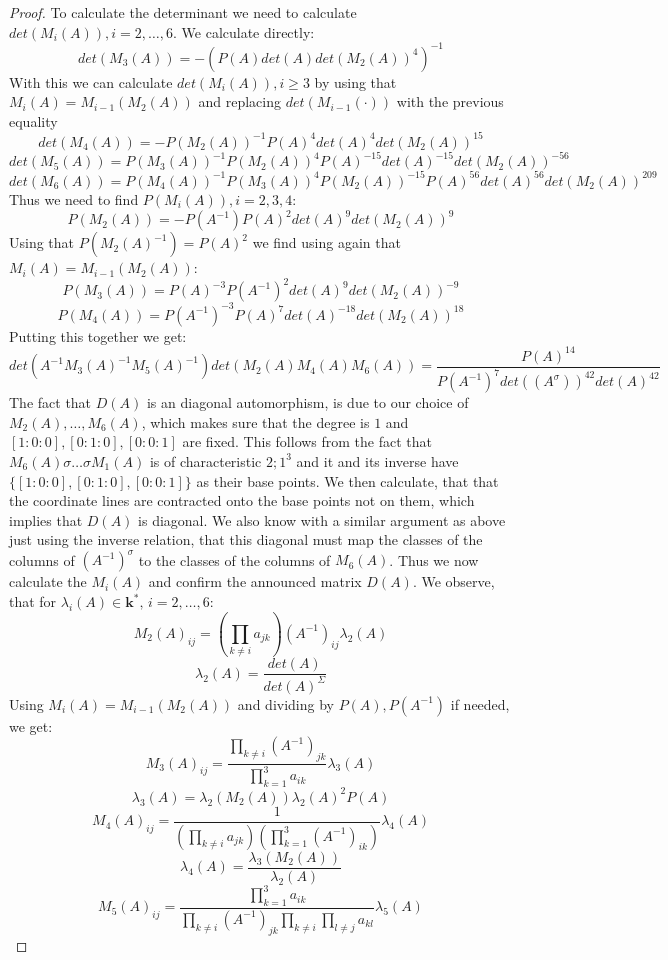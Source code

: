 \documentclass[12pt, oneside, reqno]{amsart}
\begin{document}
\begin{proof}
    To calculate the determinant we need to calculate $det(M_i(A)), i=2, \dots , 6$. We calculate directly:
    \[det(M_3(A))=-(P(A)det(A)det(M_2(A))^4)^{-1}\]
    With this we can calculate $det(M_i(A)), i \geq 3$ by using that $M_i(A) = M_{i-1}(M_2(A))$ and replacing $det(M_{i-1}(\cdot))$ with the previous equality
    \[det(M_4(A))=-P(M_2(A))^{-1}P(A)^4det(A)^4det(M_2(A))^{15}\]
    \[det(M_5(A))=P(M_3(A))^{-1}P(M_2(A))^4P(A)^{-15}det(A)^{-15}det(M_2(A))^{-56}\]
    \[det(M_6(A))=P(M_4(A))^{-1}P(M_3(A))^4P(M_2(A))^{-15}P(A)^{56}det(A)^{56}det(M_2(A))^{209}\]
    Thus we need to find $P(M_i(A)), i=2,3,4$:
    \[P(M_2(A)) = -P(A^{-1})P(A)^2det(A)^9det(M_2(A))^9\]
    Using that $P(M_2(A)^{-1}) = P(A)^2$ we find using again that $M_i(A) = M_{i-1}(M_2(A))$:
    \[P(M_3(A)) = P(A)^{-3}P(A^{-1})^2det(A)^9det(M_2(A))^{-9}\]
    \[P(M_4(A))=P(A^{-1})^{-3}P(A)^7det(A)^{-18}det(M_2(A))^{18}\]
    Putting this together we get:
    \[det(A^{-1}M_3(A)^{-1}M_5(A)^{-1})det(M_2(A)M_4(A)M_6(A)) = \frac{P(A)^{14}}{P(A^{-1})^7 det((A^{\sigma}))^{42}det(A)^{42}}\]
    The fact that $D(A)$ is an diagonal automorphism, is due to our choice of $M_2(A), \dots , M_6(A)$, which makes sure that the degree is $1$ and $[1:0:0], [0:1:0],[0:0:1]$ are fixed. This follows from the fact that $M_6(A) \sigma \dots \sigma M_1(A)$ is of characteristic $2;1^3$ and it and its inverse have $\{ [1:0:0], [0:1:0],[0:0:1]\}$ as their base points. We then calculate, that that the coordinate lines are contracted onto the base points not on them, which implies that $D(A)$ is diagonal. We also know with a similar argument as above just using the inverse relation, that this diagonal must map the classes of the columns of $(A^{-1})^{\sigma}$ to the classes of the columns of $M_6(A)$. Thus we now calculate the $M_i(A)$ and confirm the announced matrix $D(A)$. We observe, that for $\lambda_i(A) \in \textbf{k}^*, \, i = 2, \dots , 6$:
    \[M_2(A)_{ij} = (\prod_{k \neq i} a_{jk}) (A^{-1})_{ij} \lambda_2(A)\]
    \[\lambda_2(A) = \frac{det(A)}{det(A)^{\Sigma}}\]
    Using $M_i(A) = M_{i-1}(M_2(A))$ and dividing by $P(A), P(A^{-1})$ if needed, we get:
    \[M_3(A)_{ij} = \frac{\prod_{k \neq i}(A^{-1})_{jk}}{\prod_{k = 1}^3a_{ik}} \lambda_3(A)\]
    \[\lambda_3(A) = \lambda_2(M_2(A)) \lambda_2(A)^2P(A)\]
    \[M_4(A)_{ij} = \frac{1}{(\prod_{k \neq i}a_{jk})(\prod_{k=1}^3 (A^{-1})_{ik})} \lambda_4(A)\]
    \[\lambda_4(A) = \frac{\lambda_3(M_2(A))}{\lambda_2(A)}\]
    \[M_5(A)_{ij} = \frac{\prod_{k=1}^3a_{ik}}{\prod_{k \neq i}(A^{-1})_{jk} \prod_{k \neq i} \prod_{l \neq j} a_{kl}} \lambda_5(A)\]

\end{proof}
\end{document}

